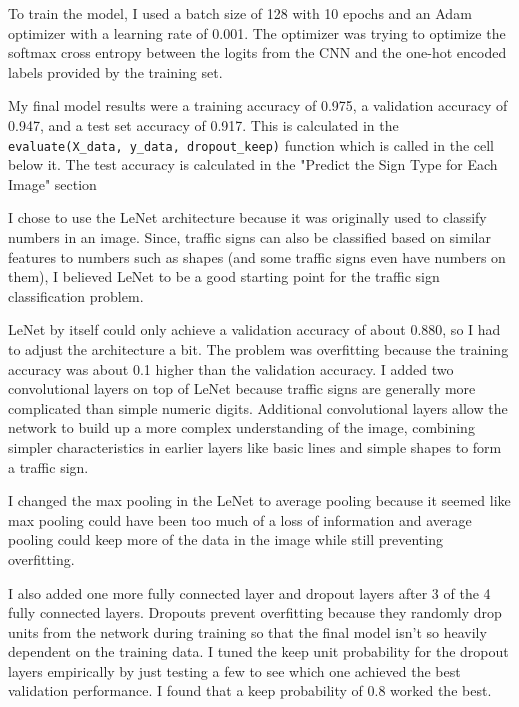 \documentclass[12pt]{article}
\begin{document}
To train the model, I used a batch size of 128 with 10 epochs and an Adam optimizer with a learning rate of 0.001. The optimizer was trying to optimize the softmax cross entropy between the logits from the CNN and the one-hot encoded labels provided by the training set.

My final model results were a training accuracy of 0.975, a validation accuracy of 0.947, and a test set accuracy of 0.917. This is calculated in the \verb|evaluate(X_data, y_data, dropout_keep)| function which is called in the cell below it. The test accuracy is calculated in the "Predict the Sign Type for Each Image" section

I chose to use the LeNet architecture because it was originally used to classify numbers in an image. Since, traffic signs can also be classified based on similar features to numbers such as shapes (and some traffic signs even have numbers on them), I believed LeNet to be a good starting point for the traffic sign classification problem.

LeNet by itself could only achieve a validation accuracy of about 0.880, so I had to adjust the architecture a bit. The problem was overfitting because the training accuracy was about 0.1 higher than the validation accuracy. I added two convolutional layers on top of LeNet because traffic signs are generally more complicated than simple numeric digits. Additional convolutional layers allow the network to build up a more complex understanding of the image, combining simpler characteristics in earlier layers like basic lines and simple shapes to form a traffic sign. 

I changed the max pooling in the LeNet to average pooling because it seemed like max pooling could have been too much of a loss of information and average pooling could keep more of the data in the image while still preventing overfitting.

I also added one more fully connected layer and dropout layers after 3 of the 4 fully connected layers. Dropouts prevent overfitting because they randomly drop units from the network during training so that the final model isn't so heavily dependent on the training data. I tuned the keep unit probability for the dropout layers empirically by just testing a few to see which one achieved the best validation performance. I found that a keep probability of 0.8 worked the best.
\end{document}

